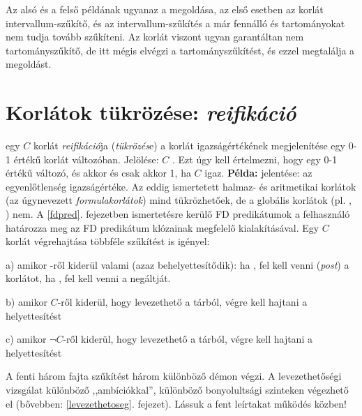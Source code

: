 Az alsó és a felső példának ugyanaz a megoldása, az első esetben az 
korlát intervallum-szűkítő, és az intervallum-szűkítés a már fennálló 
és  tartományokat nem tudja tovább szűkíteni. Az 
korlát viszont ugyan garantáltan nem tartományszűkítő, de itt mégis elvégzi a
tartományszűkítést, és ezzel megtalálja a megoldást.

\section{Korlátok tükrözése: \emph{reifikáció}}

 egy $C$ korlát \emph{reifikáció}ja (\emph{tükrözés}e) a korlát
igazságértékének megjelenítése egy 0-1 értékű korlát változóban. Jelölése:
$C$ . Ezt úgy kell értelmezni, hogy  egy 0-1 értékű változó,
és  akkor és csak akkor 1, ha $C$ igaz.
\br
{\bf Példa:}  jelentése:  az  egyenlőtlenség
igazságértéke.
\br
Az eddig ismertetett halmaz- és aritmetikai korlátok (az úgynevezett \emph{formulakorlátok})
mind tükrözhetőek, de a globális korlátok (pl. , )
nem. A \ref{fdpred}. fejezetben ismertetésre kerülő FD predikátumok a
felhasználó határozza meg az FD predikátum klózainak megfelelő kialakításával.
\br
Egy $C$  korlát végrehajtása többféle szűkítést is igényel:

\begin{description}
\item a) amikor -ről kiderül valami (azaz behelyettesítődik): ha ,
fel kell venni ({\em post}) a korlátot, ha , fel kell venni a negáltját.
\item b) amikor $C$-ről kiderül, hogy levezethető a tárból, végre kell hajtani
a  helyettesítést
\item c) amikor $\lnot C$-ről kiderül, hogy levezethető a tárból, végre kell
hajtani a  helyettesítést
\end{description}

A fenti három fajta szűkítést három különböző démon végzi. A levezethetőségi vizsgálat
különböző ,,ambíciókkal'', különböző bonyolultsági szinteken végezhető el (bővebben:
\ref{levezethetoseg}. fejezet).
\br
Lássuk a fent leírtakat működés közben!

